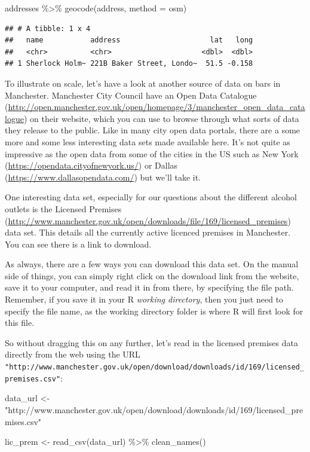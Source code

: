 \documentclass[
  krantz2]{krantz}
\makeatletter
\newenvironment{Shaded}{\begin{snugshade}}{\end{snugshade}}
\newcommand{\AttributeTok}[1]{\textcolor[rgb]{0.61,0.61,0.61}{#1}}
\newcommand{\FunctionTok}[1]{\textcolor[rgb]{0,0,0}{#1}}
\newcommand{\NormalTok}[1]{#1}
\newcommand{\OtherTok}[1]{\textcolor[rgb]{0.37,0.37,0.37}{#1}}
\newcommand{\SpecialCharTok}[1]{\textcolor[rgb]{0,0,0}{#1}}
\newcommand{\StringTok}[1]{\textcolor[rgb]{0.5,0.5,0.5}{#1}}
\newenvironment{kframe}{%
\medskip{}
\setlength{\fboxsep}{.8em}
 \def\at@end@of@kframe{}%
 \ifinner\ifhmode%
  \def\at@end@of@kframe{\end{minipage}}%
  \begin{minipage}{\columnwidth}%
 \fi\fi%
 \def\FrameCommand##1{\hskip\@totalleftmargin \hskip-\fboxsep
 \colorbox{shadecolor}{##1}\hskip-\fboxsep
     \hskip-\linewidth \hskip-\@totalleftmargin \hskip\columnwidth}%
 \MakeFramed {\advance\hsize-\width
   \@totalleftmargin\z@ \linewidth\hsize
   \@setminipage}}%
 {\par\unskip\endMakeFramed%
 \at@end@of@kframe}
\renewenvironment{Shaded}{\begin{kframe}}{\end{kframe}}
\makeatother
\begin{document}
\begin{Shaded}
\begin{Highlighting}[]
\NormalTok{addresses }\SpecialCharTok{\%\textgreater{}\%} \FunctionTok{geocode}\NormalTok{(address, }\AttributeTok{method =} \StringTok{\textquotesingle{}osm\textquotesingle{}}\NormalTok{)}
\end{Highlighting}
\end{Shaded}

\begin{verbatim}
## # A tibble: 1 x 4
##   name           address                     lat   long
##   <chr>          <chr>                     <dbl>  <dbl>
## 1 Sherlock Holm~ 221B Baker Street, Londo~  51.5 -0.158
\end{verbatim}

To illustrate on scale, let's have a look at another source of data on bars in Manchester. Manchester City Council have an Open Data Catalogue (\url{http://open.manchester.gov.uk/open/homepage/3/manchester_open_data_catalogue}) on their website, which you can use to browse through what sorts of data they release to the public. Like in many city open data portals, there are a some more and some less interesting data sets made available here. It's not quite as impressive as the open data from some of the cities in the US such as New York (\url{https://opendata.cityofnewyork.us/}) or Dallas (\url{https://www.dallasopendata.com/}) but we'll take it.

One interesting data set, especially for our questions about the different alcohol outlets is the Licensed Premises (\url{http://www.manchester.gov.uk/open/downloads/file/169/licensed_premises}) data set. This details all the currently active licenced premises in Manchester. You can see there is a link to download.

As always, there are a few ways you can download this data set. On the manual side of things, you can simply right click on the download link from the website, save it to your computer, and read it in from there, by specifying the file path. Remember, if you save it in your R \emph{working directory}, then you just need to specify the file name, as the working directory folder is where R will first look for this file.

So without dragging this on any further, let's read in the licensed premises data directly from the web using the URL \texttt{"http://www.manchester.gov.uk/open/download/downloads/id/169/licensed\_premises.csv"}:

\begin{Shaded}
\begin{Highlighting}[]
\NormalTok{data\_url }\OtherTok{\textless{}{-}} \StringTok{"http://www.manchester.gov.uk/open/download/downloads/id/169/licensed\_premises.csv"}

\NormalTok{lic\_prem }\OtherTok{\textless{}{-}} \FunctionTok{read\_csv}\NormalTok{(data\_url) }\SpecialCharTok{\%\textgreater{}\%} \FunctionTok{clean\_names}\NormalTok{()}
\end{Highlighting}
\end{Shaded}
\end{document}
